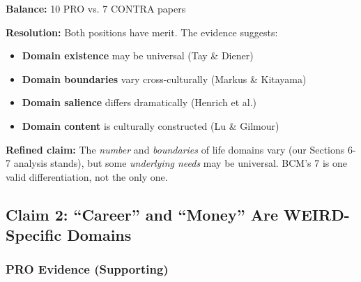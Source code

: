 \begin{tcolorbox}[colback=yellow!5!white, colframe=yellow!75!black, title=Evidence Synthesis: Claim 1]

\textbf{Balance:} 10 PRO vs. 7 CONTRA papers

\textbf{Resolution:} Both positions have merit. The evidence suggests:
\begin{itemize}[nosep]
\item \textbf{Domain existence} may be universal (Tay \& Diener)
\item \textbf{Domain boundaries} vary cross-culturally (Markus \& Kitayama)
\item \textbf{Domain salience} differs dramatically (Henrich et al.)
\item \textbf{Domain content} is culturally constructed (Lu \& Gilmour)
\end{itemize}

\textbf{Refined claim:} The \textit{number} and \textit{boundaries} of life domains vary (our Sections 6-7 analysis stands), but some \textit{underlying needs} may be universal. BCM's 7 is one valid differentiation, not the only one.

\end{tcolorbox}

\subsection{Claim 2: ``Career'' and ``Money'' Are WEIRD-Specific Domains}

\subsubsection{PRO Evidence (Supporting)}

